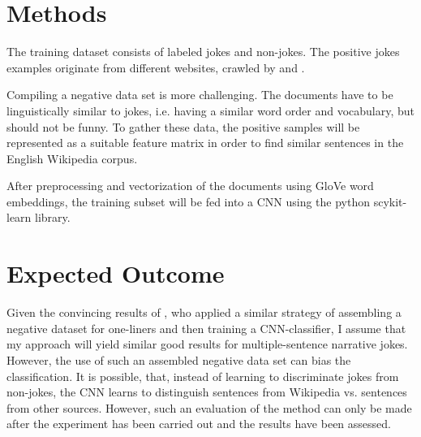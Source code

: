 \documentclass[12pt]{scrartcl}
\begin{document}
\section{Methods}
The training dataset consists of labeled jokes and non-jokes. The positive jokes examples originate from different websites, crawled by \cite{pungasDatasetEnglishPlaintext2017} and \cite{moudgilPythonScriptsBuilding2017}. 

Compiling a negative data set is more challenging. The documents have to be linguistically similar to jokes, i.e. having a similar word order and vocabulary, but should not be funny. To gather these data, the positive samples will be represented as a suitable feature matrix in order to find similar sentences in the English Wikipedia corpus. 
 
After preprocessing and vectorization of the documents using GloVe word embeddings, the training subset will be fed into a CNN using the python scykit-learn library. 



\section{Expected Outcome}
Given the convincing results of \cite{chenHumorRecognitionUsing2018}, who applied a similar strategy of assembling a negative dataset for one-liners and then training a CNN-classifier, I assume that my approach will yield similar good results for multiple-sentence narrative jokes. However, the use of such an assembled negative data set can bias the classification. It is possible, that, instead of learning to discriminate jokes from non-jokes, the CNN learns to distinguish sentences from Wikipedia vs. sentences from other sources. However, such an evaluation of the method can only be made after the experiment has been carried out and the results have been assessed.



\end{document}

